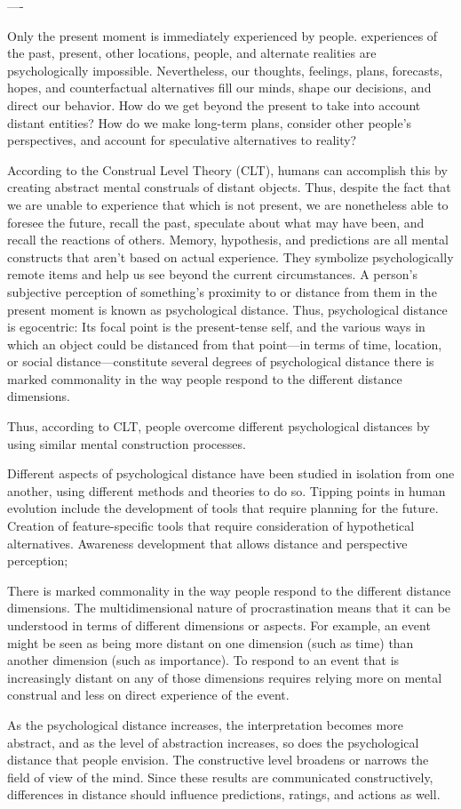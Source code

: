 




----

Only the present moment is immediately experienced by people.
experiences of the past, present, other locations, people, and alternate realities are psychologically impossible.
Nevertheless, our thoughts, feelings, plans, forecasts, hopes, and counterfactual alternatives fill our minds, shape our decisions, and direct our behavior.
How do we get beyond the present to take into account distant entities?
How do we make long-term plans, consider other people's perspectives, and account for speculative alternatives to reality?

According to the Construal Level Theory (CLT), humans can accomplish this by creating abstract mental construals of distant objects.
Thus, despite the fact that we are unable to experience that which is not present, we are nonetheless able to foresee the future, recall the past, speculate about what may have been, and recall the reactions of others.
Memory, hypothesis, and predictions are all mental constructs that aren't based on actual experience.
They symbolize psychologically remote items and help us see beyond the current circumstances.
A person's subjective perception of something's proximity to or distance from them in the present moment is known as psychological distance.
Thus, psychological distance is egocentric: Its focal point is the present-tense self, and the various ways in which an object could be distanced from that point—in terms of time, location, or social distance—constitute several degrees of psychological distance
there is marked commonality in the way people respond to the different distance dimensions.

Thus, according to CLT,  people overcome different psychological distances by using similar mental construction processes.

Different aspects of psychological distance have been studied in isolation from one another, using different methods and theories to do so.
Tipping points in human evolution include the development of tools that require planning for the future.
Creation of feature-specific tools that require consideration of hypothetical alternatives.
Awareness development that allows distance and perspective perception;

There is marked commonality in the way people respond to the different distance dimensions.
The multidimensional nature of procrastination means that it can be understood in terms of different dimensions or aspects. For example, an event might be seen as being more distant on one dimension (such as time) than another dimension (such as importance). To respond to an event that is increasingly distant on any of those dimensions requires relying more on mental construal and less on direct experience of the event.


As the psychological distance increases, the interpretation becomes more abstract, and as the level of abstraction increases, so does the psychological distance that people envision. The constructive level broadens or narrows the field of view of the mind. Since these results are communicated constructively, differences in distance should influence predictions, ratings, and actions as well. \cite{Trope2010Apr}
